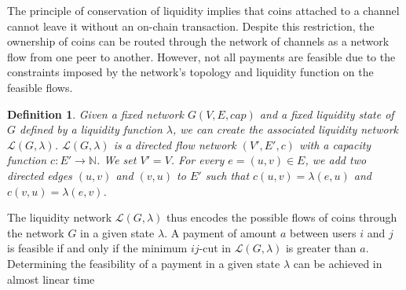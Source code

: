 \documentclass[10pt,twocolumn]{article}
\newtheorem{definition}{Definition}[section]
\begin{document}

The principle of conservation of liquidity implies that coins attached to a channel cannot leave it without an on-chain transaction.
Despite this restriction, the ownership of coins can be routed through the network of channels as a network flow from one peer to another.
However, not all payments are feasible due to the constraints imposed by the network's topology and liquidity function on the feasible flows.

\begin{definition}
Given a fixed network \(G(V,E,cap)\) and a fixed liquidity state of \(G\) defined by a liquidity function \(\lambda\), we can create the associated liquidity network \(\mathcal{L}(G,\lambda)\).
\(\mathcal{L}(G,\lambda)\) is a directed flow network \((V',E',c)\) with a capacity function \(c: E' \longrightarrow \mathbb{N}\).
We set \(V' = V\).
For every \(e = (u,v) \in E\), we add two directed edges \((u,v)\) and \((v,u)\) to \(E'\) such that \(c(u,v) = \lambda(e,u)\) and \(c(v,u) = \lambda(e,v)\).
\end{definition}

The liquidity network \(\mathcal{L}(G,\lambda)\) thus encodes the possible flows of coins through the network \(G\) in a given state \(\lambda\).
A payment of amount \(a\) between users \(i\) and \(j\) is feasible if and only if the minimum \(ij\)-cut in \(\mathcal{L}(G,\lambda)\) is greater than \(a\).
Determining the feasibility of a payment in a given state \(\lambda\) can be achieved in almost linear time \cite{chen2022maximum,chen2023almost,van2023deterministic}

\end{document}
